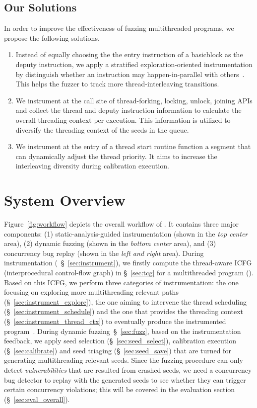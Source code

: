\subsection{Our Solutions}
In order to improve the effectiveness of fuzzing multithreaded programs, we propose the following solutions.
\begin{enumerate}[{\bf S1}]
    \item Instead of equally choosing the the entry instruction of a basicblock as the deputy instruction, we apply a stratified exploration-oriented instrumentation by distinguish whether an instruction may happen-in-parallel with others~\cite{DBLP:conf/ppopp/DiS16,DBLP:conf/cgo/SuiDX16}.
This helps the fuzzer to track more thread-interleaving transitions.
    \item We instrument at the call site of thread-forking, locking, unlock, joining APIs and collect the thread and deputy instruction information to calculate the overall threading context per execution. This information is utilized to diversify the threading context of the seeds in the queue.
    \item We instrument at the entry of a thread start routine function a segment that can dynamically adjust the thread priority. It aims to increase the interleaving diversity during calibration execution.
\end{enumerate}



 \section{System Overview}

Figure~\ref{fig:workflow} depicts the overall workflow of \mtfuzz. It contains three major components: (1) static-analysis-guided instrumentation (shown in the \emph{top center} area), (2) dynamic fuzzing (shown in the \emph{bottom center} area), and (3) concurrency bug replay (shown in the \emph{left and right} area). During instrumentation (~\S~\ref{sec:instrument}), we firstly compute the thread-aware ICFG (interprocedural control-flow graph) in \S~\ref{sec:tcg} for a multithreaded program (\ProgO). Based on this ICFG, we perform three categories of instrumentation: the one focusing on exploring more multithreading relevant paths (\S~\ref{sec:instrument_explore}), the one aiming to intervene the thread scheduling (\S~\ref{sec:instrument_schedule}) and the one that provides the threading context (\S~\ref{sec:instrument_thread_ctx}) to eventually produce the instrumented program~\Prog. During dynamic fuzzing~\S~\ref{sec:fuzz}, based on the instrumentation feedback, we apply seed selection (\S~\ref{sec:seed_select}), calibration execution (\S~\ref{sec:calibrate}) and seed triaging (\S~\ref{sec:seed_save}) that are turned for generating multithreading relevant seeds. Since the fuzzing procedure can only detect \emph{vulnerabilities} that are resulted from crashed seeds, we need a concurrency bug detector to replay with the generated seeds to see whether they can trigger certain concurrency violations; this will be covered in the evaluation section (\S~\ref{sec:eval_overall}).


